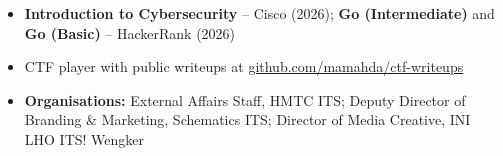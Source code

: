 \begin{itemize}
    \item \textbf{Introduction to Cybersecurity} -- Cisco (2026); \textbf{Go (Intermediate)} and \textbf{Go (Basic)} -- HackerRank (2026)
    \item CTF player with public writeups at \href{https://github.com/mamahda/ctf-writeups}{github.com/mamahda/ctf-writeups}
    \item \textbf{Organisations:} External Affairs Staff, HMTC ITS; Deputy Director of Branding \& Marketing, Schematics ITS; Director of Media Creative, INI LHO ITS! Wengker
\end{itemize}


